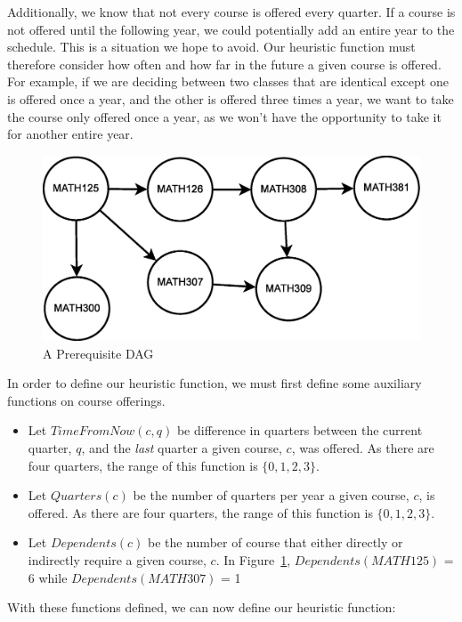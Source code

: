 \documentclass[11pt]{article} %
\begin{document}
Additionally, we know that not every course is offered every quarter.  If
a course is not offered until the following year, we could potentially add an
entire year to the schedule.  This is a situation we hope to avoid.  Our heuristic
function must therefore consider how often and how far in the future a given
course is offered.  For example, if we are deciding between two classes
that are identical except one is offered once a year, and the other is offered
three times a year, we want to take the course only offered once a year, as we
won't have the opportunity to take it for another entire year.
\begin{figure} [ht]
    \begin{center}
        \includegraphics[scale=0.35]{more_prereq_tree}
    \end{center}
    \caption{A Prerequisite DAG}
    \label{prereq}
\end{figure}

In
order to define our heuristic function, we must first define some auxiliary
functions on course offerings.  \begin{itemize} \item Let $TimeFromNow(c, q)$ be
difference in quarters between the current quarter, $q$, and the \emph{last} quarter
a given course, $c$, was offered.  As there are four quarters, the range
of this function is $\{0, 1, 2, 3\}$.  \item Let $Quarters(c)$ be the number of
quarters per year a given course, $c$, is offered.  As there are four quarters,
the range of this function is $\{0, 1, 2, 3\}$.  \item Let $Dependents(c)$ be
the number of course that either directly or indirectly require a given course,
$c$.  In Figure~\ref{prereq}, $Dependents(MATH125)$ = 6 while
$Dependents(MATH307)$ = 1 \end{itemize}

With these functions defined, we can now define our heuristic function:
\end{document}
